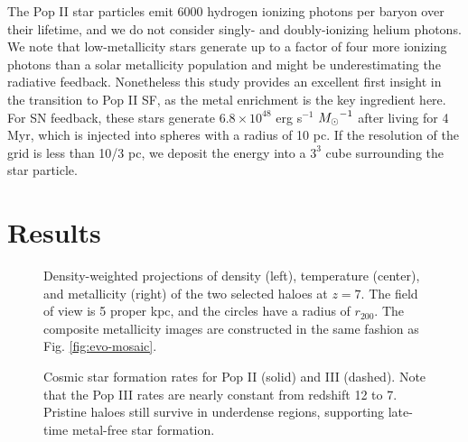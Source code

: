 \documentclass[apjl]{emulateapj}
\begin{document}
The Pop II star particles emit 6000 hydrogen ionizing photons per
baryon over their lifetime, and we do not consider singly- and
doubly-ionizing helium photons.  We note that low-metallicity stars
generate up to a factor of four more ionizing photons than a solar
metallicity population \citep{Schaerer03} and might be underestimating
the radiative feedback.  Nonetheless this study provides an excellent
first insight in the transition to Pop II SF, as the metal enrichment
is the key ingredient here.  For SN feedback, these stars generate
$6.8 \times 10^{48}$ erg s$^{-1}$ $\Ms^{-1}$ after living for 4 Myr,
which is injected into spheres with a radius of 10 pc.  If the
resolution of the grid is less than 10/3 pc, we deposit the energy
into a $3^3$ cube surrounding the star particle.

\section{Results}
\label{sec:results}




\begin{figure}
  \caption{\label{fig:halo-mosaic} Density-weighted projections of
    density (left), temperature (center), and metallicity (right) of
    the two selected haloes at $z=7$.  The field of view is 5 proper
    kpc, and the circles have a radius of $r_{200}$.  The composite
    metallicity images are constructed in the same fashion as
    Fig. \ref{fig:evo-mosaic}.}
\end{figure}



\begin{figure}
\caption{\label{fig:sfr} Cosmic star formation rates for Pop II
  (solid) and III (dashed).  Note that the Pop III rates are nearly
  constant from redshift 12 to 7.  Pristine haloes still survive in
  underdense regions, supporting late-time metal-free star formation.}
\end{figure}

\end{document}
